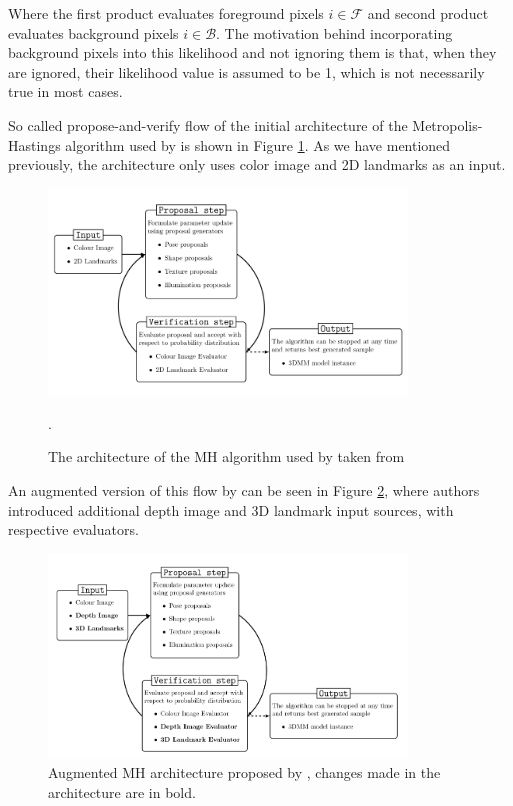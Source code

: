 Where the first product evaluates foreground pixels $i\in\mathcal F$ and second product evaluates background pixels $i\in\mathcal B$. The motivation behind incorporating background pixels into this likelihood and not ignoring them is that, when they are ignored, their likelihood value is assumed to be 1, which is not necessarily true in most cases. \bigskip

So called propose-and-verify flow of the initial architecture of the Metropolis-Hastings algorithm used by \cite{Schoenborn2017, Schoenborn2014} is shown in Figure \ref{f2.3}. As we have mentioned previously, the architecture only uses color image and 2D landmarks as an input. 

\begin{figure}
    \centering
    \includegraphics[width=0.85\textwidth]{Figures/flow1.PNG}
    \caption{The architecture of the MH algorithm used by \cite{Schoenborn2017} taken from \cite{betschard2016}}.
    \label{f2.3}
\end{figure}

An augmented version of this flow by \cite{betschard2016} can be seen in Figure \ref{f2.4}, where authors introduced additional depth image and 3D landmark input sources, with respective evaluators. \bigskip

\begin{figure}
    \centering
    \includegraphics[width=0.85\textwidth]{Figures/flow2.PNG}
    \caption{Augmented MH architecture proposed by \cite{betschard2016}, changes made in the architecture are in bold.}
    \label{f2.4}
\end{figure}

